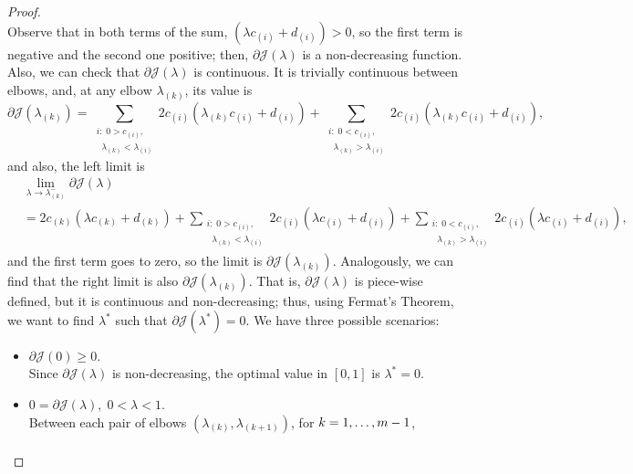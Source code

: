 \begin{proof}
\begin{equation}
    \end{equation}
    Observe that in both terms of the sum, $(\lambda c_{(i)} + d_{(i)}) > 0$, so the first term is negative and the second one positive; then, $\partial \mathcal{J}(\lambda)$ is a non-decreasing function.
    Also, we can check that $\partial \mathcal{J}(\lambda)$ is continuous. It is trivially continuous between elbows, and, at any elbow $\lambda_{(k)}$, its value is
    $$
    \partial \mathcal{J}(\lambda_{(k)}) =  \sum_{\substack{i:\; 0 > c_{(i)},\\ \;\; \lambda_{(k)} < \lambda_{(i)}}} {2 c_{(i)} (\lambda_{(k)} c_{(i)} + d_{(i)})} + \sum_{\substack{i:\; 0 < c_{(i)},\\ \;\; \lambda_{(k)} > \lambda_{(i)}}} {2 c_{(i)} (\lambda_{(k)} c_{(i)} + d_{(i)})}  ,
    $$
    and also, the left limit is 
    \begin{align*}
        &\lim_{\lambda \to \lambda_{(k)}^{-}} \partial \mathcal{J}(\lambda) \\
        &= 
        2c_{(k)} (\lambda c_{(k)} + d_{(k)})  + 
        \sum_{\substack{i:\; 0 > c_{(i)},\\ \;\; \lambda_{(k)} < \lambda_{(i)}}} {2 c_{(i)} (\lambda c_{(i)} + d_{(i)})} + \sum_{\substack{i:\; 0 < c_{(i)} ,\\ \;\; \lambda_{(k)} > \lambda_{(i)}}} {2 c_{(i)} (\lambda c_{(i)} + d_{(i)})},
    \end{align*}
    and the first term goes to zero, so the limit is $\partial \mathcal{J}(\lambda_{(k)})$. Analogously, we can find that the right limit is also $\partial \mathcal{J}(\lambda_{(k)})$.    
    That is, $\partial \mathcal{J}(\lambda)$ is piece-wise defined, but it is continuous and non-decreasing; thus, using Fermat's Theorem, we want to find $\lambda^*$ such that $\partial \mathcal{J}(\lambda^*) = 0$. We have three possible scenarios:
    \begin{itemize}
        \item $\partial \mathcal{J}(0) \geq 0.$ 
        \\Since $\partial \mathcal{J}(\lambda)$ is non-decreasing, the optimal value in $[0, 1]$ is $\lambda^* = 0$.
        \item $0 = \partial \mathcal{J}(\lambda), \; 0 < \lambda < 1$. 
        \\ Between each pair of elbows $(\lambda_{(k)}, \lambda_{(k+1)})$, for $k=1,  \dots, m-1$, 
        \begin{equation}\nonumber
            \begin{aligned}

\end{aligned}
\end{equation}
\end{itemize}
\end{proof}
